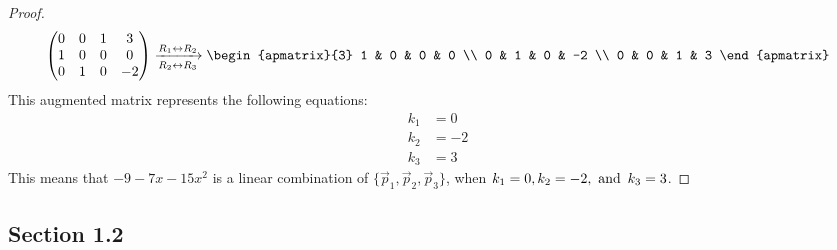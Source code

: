 \documentclass{article}
\begin{document}
\begin{enumerate}
\begin{proof}
\[            \begin{pmatrix}
                0 & 0 & 1 & 3  \\
                1 & 0 & 0 & 0  \\
                0 & 1 & 0 & -2
            \end{pmatrix} \xrightarrow[R_2 \leftrightarrow R_3]{R_1 \leftrightarrow R_2}
            \begin{apmatrix}{3}
                1 & 0 & 0 & 0  \\
                0 & 1 & 0 & -2 \\
                0 & 0 & 1 & 3
            \end{apmatrix}
        \]
        This augmented matrix represents the following equations:
        \begin{align*}
            k_1 & = 0  \\
            k_2 & = -2 \\
            k_3 & = 3
        \end{align*}
        This means that $-9-7x-15x^2$ is a linear combination of $\{\vec{p}_1,\vec{p}_2,\vec{p}_3\}$, when $k_1 = 0, k_2 = -2, \operatorname{~\text{and}~} k_3 = 3$.
    \end{proof}
\end{enumerate}

\subsection*{Section 1.2}
\end{document}
